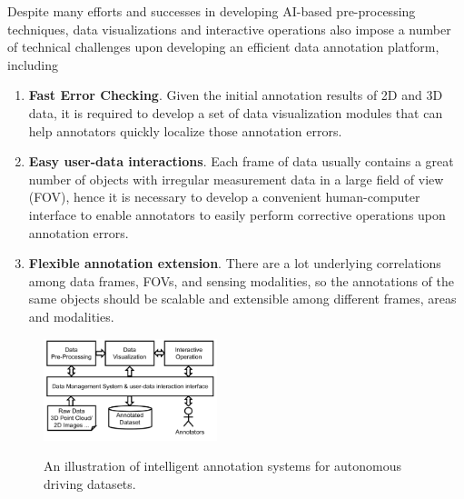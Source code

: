 \documentclass[letterpaper, 10 pt, conference]{ieeeconf}  %
\begin{document}
Despite many efforts and successes in developing AI-based pre-processing techniques, data visualizations and interactive operations also impose a number of technical challenges upon developing an efficient data annotation platform, including
\begin{enumerate}

\item \textbf{Fast Error Checking}. Given the initial annotation results of 2D and 3D data, it is required to develop a set of data visualization modules that can help annotators quickly localize those annotation errors. 
\item \textbf{Easy user-data interactions}. Each frame of data usually contains a great number of objects with irregular measurement data in a large field of view (FOV), hence it is necessary to develop a convenient human-computer interface to enable annotators to easily perform corrective operations upon annotation errors.
\item \textbf{Flexible annotation extension}. There are a lot underlying correlations among data frames, FOVs, and sensing modalities, so the annotations of the same objects should be scalable and extensible among different frames, areas and modalities.

\end{enumerate}




\begin{figure}[tp]
	\centering
	\includegraphics[width=0.45\textwidth]{./platform-simple2}\\ %
	\caption{An illustration of intelligent annotation systems for autonomous driving datasets.}
	\label{fig:main-arch}
	\vspace{-0.3cm}
\end{figure}
\end{document}
